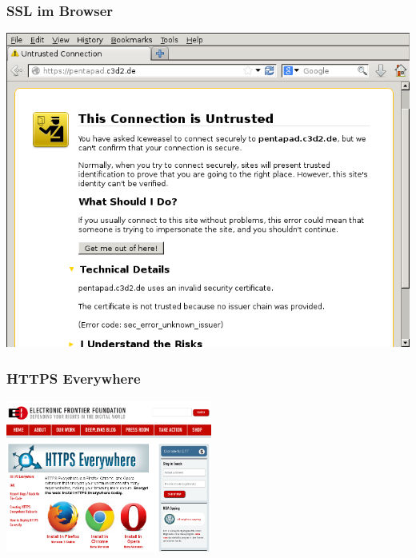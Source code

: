 \documentclass[12pt]{beamer}
\begin{document}
\begin{frame}
    \frametitle{SSL im Browser}
    \includegraphics[height=0.7\textheight]{img/ssl_unverified.png}
\end{frame}


\begin{frame}
  \frametitle{HTTPS Everywhere}
    \begin{center}
      \includegraphics[height=5cm]{img/https-everywhere.png}
    \end{center}
\end{frame}
\end{document}
